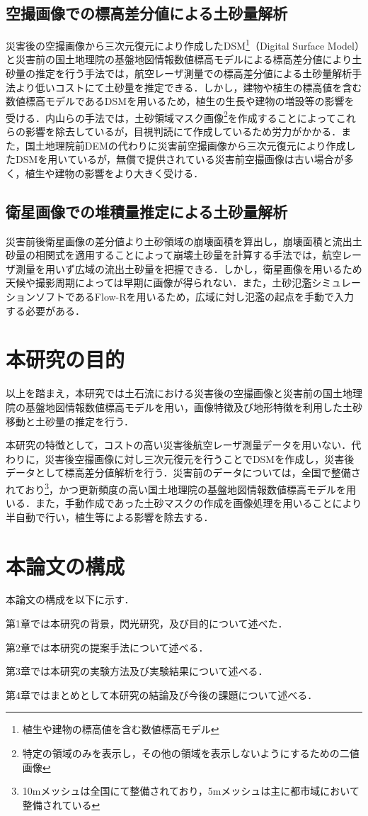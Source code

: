     \subsection*{空撮画像での標高差分値による土砂量解析}
      災害後の空撮画像から三次元復元により作成したDSM\footnote{植生や建物の標高値を含む数値標高モデル}（Digital Surface Model）と災害前の国土地理院の基盤地図情報数値標高モデル\cite{基盤地図情報}による標高差分値により土砂量の推定を行う手法\cite{土砂量解析3}では，航空レーザ測量での標高差分値による土砂量解析手法より低いコストにて土砂量を推定できる．しかし，建物や植生の標高値を含む数値標高モデルであるDSMを用いるため，植生の生長や建物の増設等の影響を受ける．内山らの手法\cite{土砂量解析4}では，土砂領域マスク画像\footnote{特定の領域のみを表示し，その他の領域を表示しないようにするための二値画像}を作成することによってこれらの影響を除去しているが，目視判読にて作成しているため労力がかかる．また，国土地理院前DEMの代わりに災害前空撮画像から三次元復元により作成したDSMを用いているが，無償で提供されている災害前空撮画像は古い場合が多く，植生や建物の影響をより大きく受ける．


    \subsection*{衛星画像での堆積量推定による土砂量解析}
      災害前後衛星画像の差分値より土砂領域の崩壊面積を算出し，崩壊面積と流出土砂量の相関式を適用することによって崩壊土砂量を計算する手法\cite{土砂量解析5}では，航空レーザ測量を用いず広域の流出土砂量を把握できる．しかし，衛星画像を用いるため天候や撮影周期によっては早期に画像が得られない．また，土砂氾濫シミュレーションソフトであるFlow-R\cite{Flow-R}を用いるため，広域に対し氾濫の起点を手動で入力する必要がある．



  \section{本研究の目的}
    以上を踏まえ，本研究では土石流における災害後の空撮画像と災害前の国土地理院の基盤地図情報数値標高モデルを用い，画像特徴及び地形特徴を利用した土砂移動と土砂量の推定を行う．
    
    本研究の特徴として，コストの高い災害後航空レーザ測量データを用いない．代わりに，災害後空撮画像に対し三次元復元を行うことでDSMを作成し，災害後データとして標高差分値解析を行う．災害前のデータについては，全国で整備されており\footnote{10mメッシュは全国にて整備されており，5mメッシュは主に都市域において整備されている}，かつ更新頻度の高い国土地理院の基盤地図情報数値標高モデルを用いる．また，手動作成であった土砂マスクの作成を画像処理を用いることにより半自動で行い，植生等による影響を除去する．



  \section{本論文の構成}
    本論文の構成を以下に示す．
    
    第1章では本研究の背景，閃光研究，及び目的について述べた．

    第2章では本研究の提案手法について述べる．

    第3章では本研究の実験方法及び実験結果について述べる．

    第4章ではまとめとして本研究の結論及び今後の課題について述べる．
